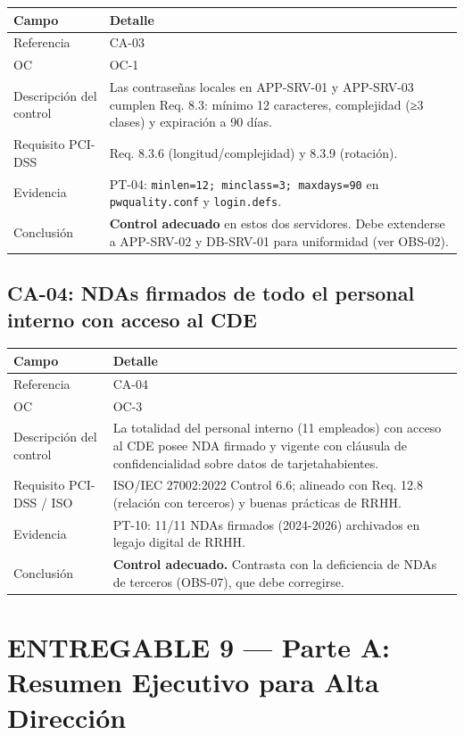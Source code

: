 \documentclass[11pt,a4paper]{article}
\begin{document}
\begin{tabularx}{\textwidth}{P{5cm}L}
\toprule
\textbf{Campo} & \textbf{Detalle} \\
\midrule
Referencia & CA-03 \\
OC & OC-1 \\
Descripción del control & Las contraseñas locales en APP-SRV-01 y APP-SRV-03 cumplen Req. 8.3: mínimo 12 caracteres, complejidad (≥3 clases) y expiración a 90 días. \\
Requisito PCI-DSS & Req. 8.3.6 (longitud/complejidad) y 8.3.9 (rotación). \\
Evidencia & PT-04: \texttt{minlen=12; minclass=3; maxdays=90} en \texttt{pwquality.conf} y \texttt{login.defs}. \\
Conclusión & \textbf{Control adecuado} en estos dos servidores. Debe extenderse a APP-SRV-02 y DB-SRV-01 para uniformidad (ver OBS-02). \\
\bottomrule
\end{tabularx}

\subsection{CA-04: NDAs firmados de todo el personal interno con acceso al CDE}

\begin{tabularx}{\textwidth}{P{5cm}L}
\toprule
\textbf{Campo} & \textbf{Detalle} \\
\midrule
Referencia & CA-04 \\
OC & OC-3 \\
Descripción del control & La totalidad del personal interno (11 empleados) con acceso al CDE posee NDA firmado y vigente con cláusula de confidencialidad sobre datos de tarjetahabientes. \\
Requisito PCI-DSS / ISO & ISO/IEC 27002:2022 Control 6.6; alineado con Req. 12.8 (relación con terceros) y buenas prácticas de RRHH. \\
Evidencia & PT-10: 11/11 NDAs firmados (2024-2026) archivados en legajo digital de RRHH. \\
Conclusión & \textbf{Control adecuado.} Contrasta con la deficiencia de NDAs de terceros (OBS-07), que debe corregirse. \\
\bottomrule
\end{tabularx}

\clearpage

\section{ENTREGABLE 9 — Parte A: Resumen Ejecutivo para Alta Dirección}
\end{document}
